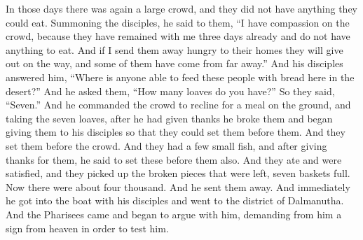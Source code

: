 \begin{biblechapter} %
 In those days there was again a large crowd, and they did not have anything they could eat. Summoning the disciples, he said to them,
\verse “I have compassion on the crowd, because they have remained with me three days already and do not have anything to eat.
\verse And if I send them away hungry to their homes they will give out on the way, and some of them have come from far away.”
\verse And his disciples answered him, “Where is anyone able to feed these people with bread here in the desert?”
\verse And he asked them, “How many loaves do you have?” So they said, “Seven.”
\verse And he commanded the crowd to recline for a meal on the ground, and taking the seven loaves, after he had given thanks he broke them and began giving them to his disciples so that they could set them before them. And they set them before the crowd.
\verse And they had a few small fish, and after giving thanks for them, he said to set these before them also.
\verse And they ate and were satisfied, and they picked up the broken pieces that were left, seven baskets full.
\verse Now there were about four thousand. And he sent them away.
\verse And immediately he got into the boat with his disciples and went to the district of Dalmanutha.
 And the Pharisees came and began to argue with him, demanding from him a sign from heaven in order to test him.

\end{biblechapter}
